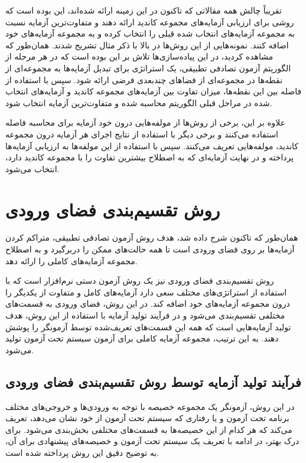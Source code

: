 تقریباً چالش همه مقالاتی که تاکنون در این زمینه ارائه شده‌اند، این بوده است که روشی برای ارزیابی آزمایه‌های مجموعه کاندید ارائه دهند و متفاوت‌ترین آزمایه نسبت به مجموعه آزمایه‌های انتخاب شده قبلی را انتخاب کرده و به مجموعه آزمایه‌های خود اضافه کنند. نمونه‌هایی از این روش‌ها در بالا با ذکر مثال تشریح شدند. همان‌طور که مشاهده کردید، در این پیاده‌سازی‌ها تلاش بر این بوده است که در هر مرحله از الگوریتم آزمون تصادفی تطبیقی، یک استراتژی برای تبدیل آزمایه‌ها به مجموعه‌ای از نقطه‌ها در مجموعه‌ای از فضاهای چندبعدی فرضی ارائه شود. سپس با استفاده از فاصله بین این نقطه‌ها، میزان تفاوت بین آزمایه‌های مجموعه کاندید و آزمایه‌های انتخاب شده در مراحل قبلی الگوریتم محاسبه شده و متفاوت‌ترین آزمایه انتخاب شود.

علاوه بر این، برخی از روش‌ها از مولفه‌هایی درون خود آزمایه برای محاسبه فاصله استفاده می‌کنند و برخی دیگر با استفاده از نتایج اجرای هر آزمایه درون مجموعه کاندید، مولفه‌هایی تعریف می‌کنند. سپس با استفاده از این مولفه‌ها به ارزیابی آزمایه‌ها پرداخته و در نهایت آزمایه‌ای که به اصطلاح بیشترین تفاوت را با مجموعه کاندید دارد، انتخاب می‌شود.

\section{روش تقسیم‌بندی فضای ورودی}

همان‌طور که تاکنون شرح داده شد، هدف روش آزمون تصادفی تطبیقی، متراکم کردن آزمایه‌ها بر روی فضای ورودی است تا همه حالت‌های ممکن را دربرگیرد و به اصطلاح مجموعه آزمایه‌های کاملی را ارائه دهد.

روش تقسیم‌بندی فضای ورودی نیز یک روش آزمون دستی نرم‌افزار است که با استفاده از استراتژی‌های مختلف سعی دارد آزمایه‌های کامل و متفاوت از یکدیگر را درون مجموعه آزمایه‌های خود اضافه کند. در این روش، فضای ورودی به قسمت‌های مختلفی تقسیم‌بندی می‌شود و در فرآیند تولید آزمایه با استفاده از این روش، هدف تولید آزمایه‌هایی است که همه این قسمت‌های تعریف‌شده توسط آزمونگر را پوشش دهند. به این ترتیب، مجموعه آزمایه کاملی برای آزمون سیستم تحت آزمون تولید می‌شود.

\subsection{فرآیند تولید آزمایه توسط روش تقسیم‌بندی فضای ورودی}

در این روش، آزمونگر یک مجموعه خصیصه با توجه به ورودی‌ها و خروجی‌های مختلف برنامه تحت آزمون و یا رفتاری که سیستم تحت آزمون از خود نشان می‌دهد، تعریف می‌کند که هر کدام از این خصیصه‌ها به قسمت‌های مختلفی بخش‌بندی می‌شود. برای درک بهتر، در ادامه با تعریف یک سیستم تحت آزمون و خصیصه‌های پیشنهادی برای آن، به توضیح دقیق این روش پرداخته شده است.

